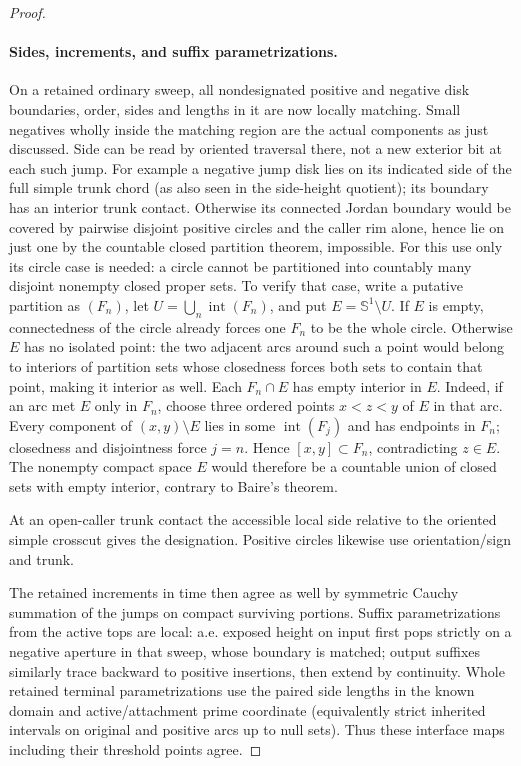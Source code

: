 \begin{proof}
\paragraph{Sides, increments, and suffix parametrizations.}

On a retained ordinary sweep, all nondesignated positive and negative disk boundaries, order, sides and
lengths in it are now locally matching. Small negatives wholly inside the matching region are the actual
components as just discussed. Side can be read by oriented traversal there, not a new exterior bit at each
such jump. For example a negative jump disk lies on its indicated side of the full simple trunk chord (as
also seen in the side-height quotient); its boundary has an interior trunk contact. Otherwise its connected
Jordan boundary would be covered by pairwise disjoint positive circles and the caller rim alone, hence lie
on just one by the countable closed partition theorem, impossible. For this use only its
circle case is needed: a circle cannot be partitioned into countably many disjoint nonempty
closed proper sets. To verify that case, write a putative partition as \((F_n)\), let
\(U=\bigcup_n\operatorname{int}(F_n)\), and put \(E=\mathbb S^1\setminus U\).
If \(E\) is empty, connectedness of the circle already forces one \(F_n\) to be the whole
circle. Otherwise \(E\) has no isolated point: the two adjacent arcs around such a point
would belong to interiors of partition sets whose closedness forces both sets to contain that
point, making it interior as well. Each \(F_n\cap E\) has empty interior in \(E\). Indeed,
if an arc met \(E\) only in \(F_n\), choose three ordered points \(x<z<y\) of \(E\) in
that arc. Every component of \((x,y)\setminus E\) lies in some \(\operatorname{int}(F_j)\)
and has endpoints in \(F_n\); closedness and disjointness force \(j=n\). Hence
\([x,y]\subset F_n\), contradicting \(z\in E\). The nonempty compact space \(E\) would
therefore be a countable union of closed sets with empty interior, contrary to Baire's theorem.

At an open-caller trunk contact the accessible local side relative to the oriented simple crosscut gives the designation. Positive
circles likewise use orientation/sign and trunk.

The retained increments in time then agree as well by
symmetric Cauchy summation of the jumps on compact surviving portions. Suffix parametrizations from the
active tops are local: a.e. exposed height on input first pops strictly on a negative aperture in that
sweep, whose boundary is matched; output suffixes similarly trace backward to positive insertions, then
extend by continuity. Whole retained terminal parametrizations use the paired side lengths in the known
domain and active/attachment prime coordinate (equivalently strict inherited intervals on original and
positive arcs up to null sets). Thus these interface maps including their threshold points agree.


\end{proof}
